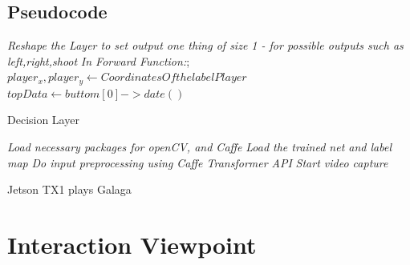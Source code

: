 \subsection{Pseudocode}\label{sssec:num3}
\begin{algorithm}
  \emph{Reshape the Layer to set output one thing of size 1 - for possible outputs such as left,right,shoot}\;
  \emph{In Forward Function:};\newline
  \nl$player_x,player_y\leftarrow Coordinates Of the label Player$\;
  \nl$topData\leftarrow buttom[0]->date()$\;

    \caption{Decision Layer}
\end{algorithm}

\begin{algorithm}
  \emph{Load necessary packages for openCV, and Caffe}\;
  \emph{Load the trained net and label map}\;
  \emph{Do input preprocessing using Caffe Transformer API}\;
  \emph{Start video capture}\;

    \caption{Jetson TX1 plays Galaga}
\end{algorithm}

\section{Interaction Viewpoint}\label{sssec:num1}%

